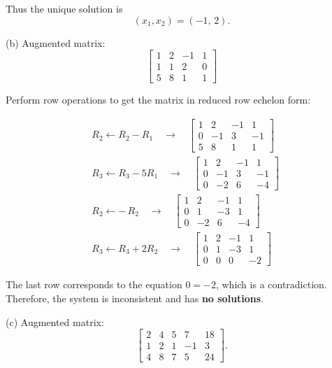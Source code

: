 \documentclass{article}
\begin{document}
Thus the unique solution is
\[
(x_1, x_2) = (-1,\, 2).
\]

\bigskip

(b) Augmented matrix:
\[
\left[
\begin{array}{ccc|c}
1 & 2 & -1 & 1 \\
1 & 1 & 2 & 0 \\
5 & 8 & 1 & 1
\end{array}
\right]
\]

Perform row operations to get the matrix in reduced row echelon form:

\begin{align*}
& R_2 \leftarrow R_2 - R_1 
\quad \longrightarrow 
\quad
\left[
\begin{array}{ccc|c}
1 & 2 & -1 & 1 \\
0 & -1 & 3 & -1 \\
5 & 8 & 1 & 1
\end{array}
\right] \\
& R_3 \leftarrow R_3 - 5R_1 
\quad \longrightarrow 
\quad
\left[
\begin{array}{ccc|c}
1 & 2 & -1 & 1 \\
0 & -1 & 3 & -1 \\
0 & -2 & 6 & -4
\end{array}
\right] \\
& R_2 \leftarrow -\,R_2 
\quad \longrightarrow 
\quad
\left[
\begin{array}{ccc|c}
1 & 2 & -1 & 1 \\
0 & 1 & -3 & 1 \\
0 & -2 & 6 & -4
\end{array}
\right] \\
& R_3 \leftarrow R_3 + 2R_2 
\quad \longrightarrow 
\quad
\left[
\begin{array}{ccc|c}
1 & 2 & -1 & 1 \\
0 & 1 & -3 & 1 \\
0 & 0 & 0 & -2
\end{array}
\right]
\end{align*}

The last row corresponds to the equation \( 0 = -2 \), which is a contradiction. Therefore, the system is inconsistent and has \textbf{no solutions}.

\bigskip

(c) Augmented matrix:
\[
\left[
\begin{array}{cccc|c}
2 & 4 & 5 & 7 & 18 \\
1 & 2 & 1 & -1 & 3 \\
4 & 8 & 7 & 5 & 24
\end{array}
\right].
\]
\end{document}
